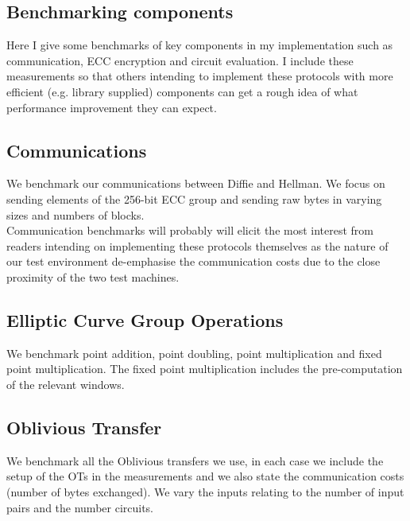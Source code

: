 \documentclass[ %
                    author={Nicholas Tutte},
                supervisor={Prof. Nigel Smart},
                    degree={MEng},
                     title={Secure Two Party Computation},
                  subtitle={A practical comparison of recent protocols},
                      type={Research - GG1K},
                      year={2015} ]{dissertation}
\begin{document}
	\begin{appendices}

		\chapter{Benchmarking components}
			Here I give some benchmarks of key components in my implementation such as communication, ECC encryption and circuit evaluation. I include these measurements so that others intending to implement these protocols with more efficient (e.g. library supplied) components can get a rough idea of what performance improvement they can expect.

			\section{Communications}

				We benchmark our communications between Diffie and Hellman. We focus on sending elements of the 256-bit ECC group and sending raw bytes in varying sizes and numbers of blocks.\\

				Communication benchmarks will probably will elicit the most interest from readers intending on implementing these protocols themselves as the nature of our test environment de-emphasise the communication costs due to the close proximity of the two test machines.\\


			\section{Elliptic Curve Group Operations}

				We benchmark point addition, point doubling, point multiplication and fixed point multiplication. The fixed point multiplication includes the pre-computation of the relevant windows.

			\section{Oblivious Transfer}
				We benchmark all the Oblivious transfers we use, in each case we include the setup of the OTs in the measurements and we also state the communication costs (number of bytes exchanged). We vary the inputs relating to the number of input pairs and the number circuits.


\end{appendices}
\end{document}
